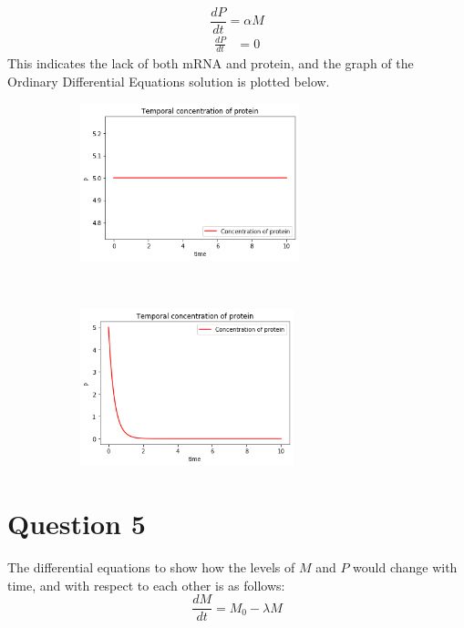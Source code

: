 \documentclass[12pt,a4paper]{article}
\begin{document}
\begin{equation}
\frac{dP}{dt} = \alpha M 
\label{eq:4}
\end{equation}
\begin{align*}
\frac{dP}{dt} &=  0
\end{align*}
This indicates the lack of both mRNA and protein,  and the graph of the Ordinary Differential Equations solution is plotted below.
\begin{figure}[th!]
    \centering
    \begin{subfigure}[t]{0.5\textwidth}
        \centering
        \includegraphics[height=1.8in]{./gaphics/q_4a.png}
    \end{subfigure}%
    ~ 
    \begin{subfigure}[t]{0.5\textwidth}
        \centering
        \includegraphics[height=1.8in]{./gaphics/q_4b.png}
    \end{subfigure}
    \caption{}
\end{figure}
\section*{Question 5}
The differential equations to  show
how the levels of $M$ and $P$ would change with time, and with respect to each other is as follows:
\begin{equation}
  \frac{dM}{dt} = M_0 -  \lambda M 
  \label{eq:5}
\end{equation} 
\end{document}
